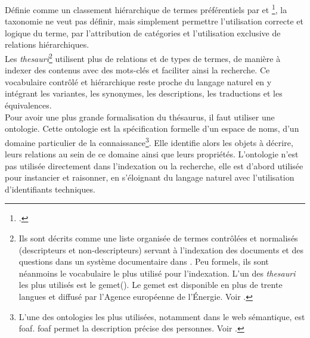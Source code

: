 Définie comme un \og classement hiérarchique de termes préférentiels\fg{} par  et \footcite{rosenfeld_information_2015}, la taxonomie ne veut pas définir, mais simplement permettre l'utilisation correcte et logique du terme, par l'attribution de catégories et l'utilisation exclusive de relations hiérarchiques.\\

Les \textit{thesauri}\footnote{Ils sont décrits comme une \og liste organisée de termes contrôlées et normalisés (descripteurs et non-descripteurs) servant à l’indexation des documents et des questions dans un système documentaire\fg{} dans \cite{degez_thesauroglossaire_2001}. Peu formels, ils sont néanmoins le vocabulaire le plus utilisé pour l'indexation. L'un des \textit{thesauri} les plus utilisés est le \ac{gemet}(\cite{noauthor_general_nodate}). Le \ac{gemet} est disponible en plus de trente langues et diffusé par l'Agence européenne de l'Énergie. Voir .} utilisent plus de relations et de types de termes, de manière à indexer des contenus avec des mots-clés et faciliter ainsi la recherche. Ce vocabulaire contrôlé et hiérarchique reste proche du langage naturel en y intégrant les variantes, les synonymes, les descriptions, les traductions et les équivalences.\\

Pour avoir une plus grande formalisation du thésaurus, il faut utiliser une ontologie. Cette ontologie est la spécification formelle d'un espace de noms, d'un domaine particulier de la connaissance\footnote{L'une des ontologies les plus utilisées, notamment dans le web sémantique, est \ac{foaf}. \ac{foaf} permet la description précise des personnes. Voir \cite{noauthor_foaf_nodate}.}. Elle identifie alors les objets à décrire, leurs relations au sein de ce domaine ainsi que leurs propriétés. L'ontologie n'est pas utilisée directement dans l'indexation ou la recherche, elle est d'abord utilisée pour instancier et raisonner, en s'éloignant du langage naturel avec l'utilisation d'identifiants techniques.\\


